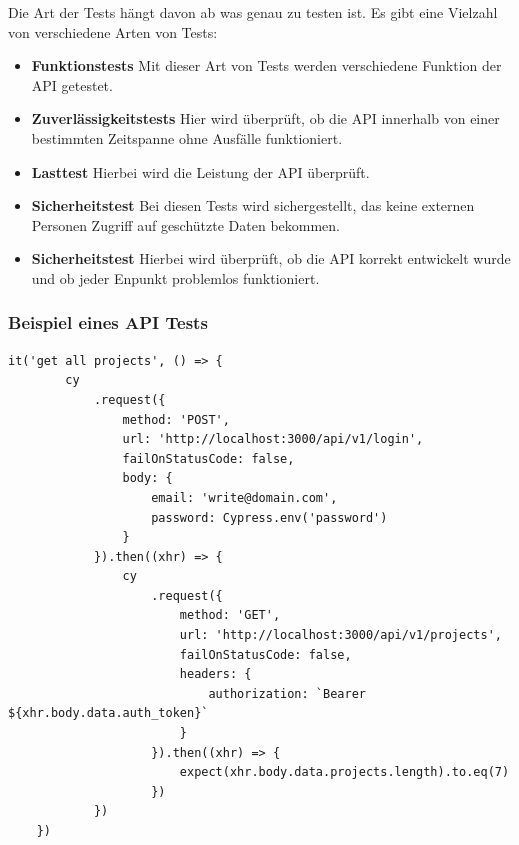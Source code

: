 Die Art der Tests hängt davon ab was genau zu testen ist. Es gibt eine Vielzahl von verschiedene Arten von Tests:

\begin{itemize}
    \item \textbf{Funktionstests}
        \newline
        Mit dieser Art von Tests werden verschiedene Funktion der API getestet.
    \item \textbf{Zuverlässigkeitstests}
        \newline
        Hier wird überprüft, ob die API innerhalb von einer bestimmten Zeitspanne ohne Ausfälle funktioniert.
    \item \textbf{Lasttest}
        \newline
        Hierbei wird die Leistung der API überprüft. 
    \item \textbf{Sicherheitstest}
        \newline
        Bei diesen Tests wird sichergestellt, das keine externen Personen Zugriff auf geschützte Daten bekommen.
    \item \textbf{Sicherheitstest}
        \newline
        Hierbei wird überprüft, ob die API korrekt entwickelt wurde und ob jeder Enpunkt problemlos funktioniert.
\end{itemize}

\subsubsection{Beispiel eines API Tests}
\begin{lstlisting}
it('get all projects', () => {
        cy
            .request({
                method: 'POST',
                url: 'http://localhost:3000/api/v1/login',
                failOnStatusCode: false,
                body: {
                    email: 'write@domain.com',
                    password: Cypress.env('password')
                }
            }).then((xhr) => {
                cy
                    .request({
                        method: 'GET',
                        url: 'http://localhost:3000/api/v1/projects',
                        failOnStatusCode: false,
                        headers: {
                            authorization: `Bearer ${xhr.body.data.auth_token}`
                        }
                    }).then((xhr) => {
                        expect(xhr.body.data.projects.length).to.eq(7)
                    })
            })
    })
\end{lstlisting}

